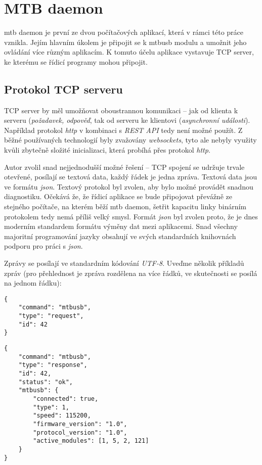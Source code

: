 \section{MTB daemon}

\gls{mtb} daemon je první ze dvou počítačových aplikací, která v rámci této
práce vznikla. Jejím hlavním úkolem je připojit se k \gls{mtbusb} modulu
a umožnit jeho ovládání více různým aplikacím. K tomuto účelu aplikace vystavuje
TCP server, ke kterému se řídicí programy mohou připojit.

\subsection{Protokol TCP serveru} \label{sec:daemon:proto}

TCP server by měl umožňovat oboustrannou komunikaci – jak od klienta k serveru
(\textit{požadavek, odpověď}, tak od serveru ke klientovi (\textit{asynchronní
události}). Například protokol \textit{http} v kombinaci s \textit{REST API}
tedy není možné použít. Z běžné používaných technologií byly zvažovány
\textit{websockets}, tyto ale nebyly využity kvůli zbytečně složité inicializaci,
která probíhá přes protokol \textit{http}.

Autor zvolil snad nejjednodušší možné řešení – TCP spojení se udržuje trvale
otevřené, posílají se textová data, každý řádek je jedna zpráva. Textová data
jsou ve formátu \textit{json}. Textový protokol byl zvolen, aby bylo možné
provádět snadnou diagnostiku. Očekává že, že řídicí aplikace se bude připojovat
převážně ze stejného počítače, na kterém běží \gls{mtb} daemon, šetřit kapacitu
linky binárním protokolem tedy nemá příliš velký smysl. Formát \textit{json}
byl zvolen proto, že je dnes moderním standardem formátu výměny dat mezi
aplikacemi. Snad všechny majoritní programování jazyky obsahují ve svých
standardních knihovnách podporu pro práci s \textit{json}.

Zprávy se posílají ve standardním kódování \textit{UTF-8}. Uveďme několik
příkladů zpráv (pro přehlednost je zpráva rozdělena na více řádků, ve skutečnosti
se posílá na jednom řádku):

\begin{verbatim}
{
    "command": "mtbusb",
    "type": "request",
    "id": 42
}
\end{verbatim}

\begin{verbatim}
{
    "command": "mtbusb",
    "type": "response",
    "id": 42,
    "status": "ok",
    "mtbusb": {
        "connected": true,
        "type": 1,
        "speed": 115200,
        "firmware_version": "1.0",
        "protocol_version": "1.0",
        "active_modules": [1, 5, 2, 121]
    }
}
\end{verbatim}

